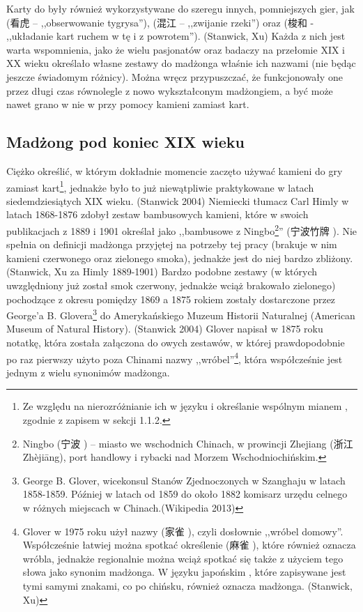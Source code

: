 Karty do  były również wykorzystywane do szeregu innych,
pomniejszych gier, jak  (看虎  -- ,,obserwowanie
tygrysa''),  (混江  -- ,,zwijanie rzeki'') oraz
 (梭和  - ,,układanie kart ruchem w tę i z
powrotem''). (Stanwick, Xu) Każda z nich jest warta wspomnienia, jako że wielu
pasjonatów oraz badaczy na przełomie XIX i XX wieku określało własne zestawy do
madżonga właśnie ich nazwami (nie będąc jeszcze świadomym różnicy).
Można wręcz przypuszczać, że funkcjonowały one przez długi czas równolegle z
nowo wykształconym madżongiem, a być może nawet grano w nie w przy pomocy
kamieni zamiast kart.
\subsection{Madżong pod koniec XIX wieku}
Ciężko określić, w którym dokładnie momencie zaczęto używać kamieni do gry
zamiast kart\footnote{Ze względu na nierozróżnianie ich w języku i określanie
wspólnym mianem , zgodnie z zapisem w sekcji 1.1.2.}, jednakże było
to już niewątpliwie praktykowane w latach siedemdziesiątych XIX wieku. (Stanwick
2004) Niemiecki tłumacz Carl Himly w latach 1868-1876 zdobył zestaw bambusowych
kamieni, które w swoich publikacjach z 1889 i 1901 określał jako ,,bambusowe
 z Ningbo\footnote{Ningbo (宁波 ) -- miasto we
wschodnich Chinach, w prowincji Zhejiang (浙江 Zhèjiāng), port handlowy i rybacki
nad Morzem Wschodniochińskim.}'' (宁波竹牌 ). Nie spełnia on
definicji madżonga przyjętej na potrzeby tej pracy (brakuje w nim kamieni
czerwonego oraz zielonego smoka), jednakże jest do niej bardzo zbliżony.
(Stanwick, Xu za Himly 1889-1901) Bardzo podobne zestawy (w których uwzględniony
już został smok czerwony, jednakże wciąż brakowało zielonego) pochodzące z
okresu pomiędzy 1869 a 1875 rokiem zostały dostarczone przez George'a B.
Glovera\footnote{George B. Glover, wicekonsul Stanów Zjednoczonych w Szanghaju w
latach 1858-1859. Później w latach od 1859 do około 1882 komisarz urzędu celnego
w różnych miejscach w Chinach.(Wikipedia 2013)} do Amerykańskiego Muzeum
Historii Naturalnej (American Museum of Natural History). (Stanwick 2004) Glover
napisał w 1875 roku notatkę, która została załączona do owych zestawów, w której
prawdopodobnie po raz pierwszy użyto poza Chinami nazwy
,,wróbel''\footnote{Glover w 1975 roku użył nazwy  (家雀
), czyli dosłownie ,,wróbel domowy''. Współcześnie łatwiej można
spotkać określenie  (麻雀 ), które również oznacza
wróbla, jednakże regionalnie można wciąż spotkać się także z użyciem tego słowa
jako synonim madżonga. W języku japońskim , które zapisywane jest
tymi samymi znakami, co  po chińsku, również oznacza madżonga.
(Stanwick, Xu)}, która współcześnie jest jednym z wielu synonimów madżonga.
